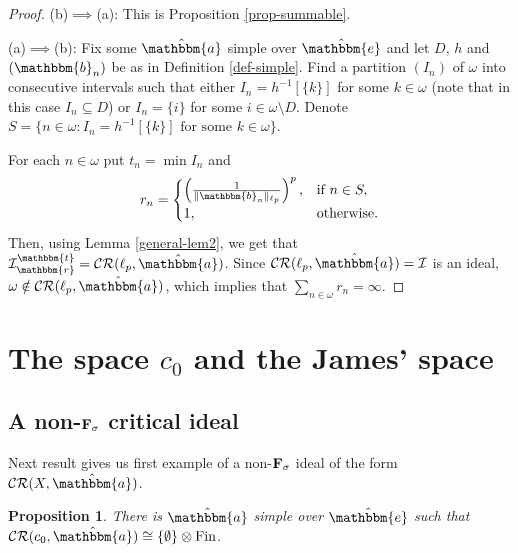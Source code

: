 \documentclass{amsart}
\newcommand{\I}{\mathcal{I}}
\newcommand{\Fin}{\mathrm{Fin}}
\newcommand{\CR}{\mathcal{CR}}
\newcommand{\w}{\mathbbm}
\newtheorem{proposition}[theorem]{Proposition}
\begin{document}
\begin{proof}
(b)$\implies$(a): This is Proposition \ref{prop-summable}.

(a)$\implies$(b): Fix some $\hat{\w{a}}$ simple over $\hat{\w{e}}$ and let $D$, $h$ and $(\w{b}_n)$ be as in Definition \ref{def-simple}. Find a partition $(I_n)$ of $\omega$ into consecutive intervals such that either $I_n=h^{-1}[\{k\}]$ for some $k\in\omega$ (note that in this case $I_n\subseteq D$) or $I_n=\{i\}$ for some $i\in\omega\setminus D$. Denote $S=\{n\in\omega: I_n=h^{-1}[\{k\}]\text{ for some }k\in\omega\}$. 

For each $n\in\omega$ put $t_n=\min I_n$ and
\[
r_n=\begin{cases}
    \left(\frac{1}{\|\w{b}_n\|_{\ell_p}}\right)^p, & \text{if } n\in S,\\
    1, & \text{otherwise}.
\end{cases}
\]
Then, using Lemma \ref{general-lem2}, we get that $\I^\w{t}_\w{r}=\CR(\ell_p,\hat{\w{a}})$. Since $\CR(\ell_p,\hat{\w{a}})=\I$ is an ideal, $\omega\notin\CR(\ell_p,\hat{\w{a}})$, which implies that $\sum_{n\in\omega}r_n=\infty$.
\end{proof}


\section{The space \texorpdfstring{$c_0$}{c } and the James' space}\label{S:c0}


\subsection{A non-\texorpdfstring{$\bf{F_\sigma}$}{} critical ideal}
Next result gives us first example of a non-$\bf{F_\sigma}$ ideal of the form $\CR(X,\hat{\w{a}})$.

\begin{proposition}
\label{0xFin}
There is $\hat{\w{a}}$ simple over $\hat{\w{e}}$ such that $\CR(c_0,\hat{\w{a}})\cong\{\emptyset\}\otimes\Fin$.
\end{proposition}
\end{document}
